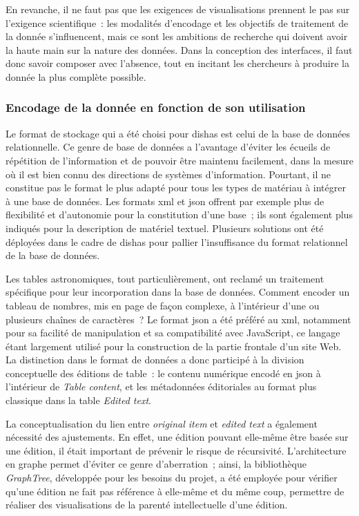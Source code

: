 \documentclass[a4paper,12pt,twoside]{book}
\newcommand{\eng}{\emph}
\newcommand{\oi}{\eng{original item}\xspace}
\newcommand{\bdd}{base de données\xspace}
\newcommand{\dishas}{\gls{dishas}\xspace}
\newcommand{\xml}{\gls{xml}\xspace}
\newcommand{\json}{\gls{json}\xspace}
\begin{document}
En revanche, il ne faut pas que les exigences de visualisations prennent le pas sur l'exigence scientifique~: les modalités d'encodage et les objectifs de traitement de la donnée s'influencent, mais ce sont les ambitions de recherche qui doivent avoir la haute main sur la nature des données. Dans la conception des interfaces, il faut donc savoir composer avec l'absence, tout en incitant les chercheurs à produire la donnée la plus complète possible.

			\subsubsection{Encodage de la donnée en fonction de son utilisation}
Le format de stockage qui a été choisi pour \dishas est celui de la \bdd relationnelle. Ce genre de \bdd a l'avantage d'éviter les écueils de répétition de l'information et de pouvoir être maintenu facilement, dans la mesure où il est bien connu des directions de systèmes d'information. Pourtant, il ne constitue pas le format le plus adapté pour tous les types de matériau à intégrer à une base de données. Les formats \xml et \json offrent par exemple plus de flexibilité et d'autonomie pour la constitution d'une base~; ils sont également plus indiqués pour la description de matériel textuel. Plusieurs solutions ont été déployées dans le cadre de \dishas pour pallier l'insuffisance du format relationnel de la base de données.

Les tables astronomiques, tout particulièrement, ont reclamé un traitement spécifique pour leur incorporation dans la \bdd. Comment encoder un tableau de nombres, mis en page de façon complexe, à l'intérieur d'une ou plusieurs chaînes de caractères~? Le format \json a été préféré au \xml, notamment pour sa facilité de manipulation et sa compatibilité avec JavaScript, ce langage étant largement utilisé pour la construction de la partie frontale d'un site Web. La distinction dans le format de données a donc participé à la division conceptuelle des éditions de table~: le contenu numérique encodé en \json à l'intérieur de \eng{Table content}, et les métadonnées éditoriales au format plus classique dans la table \eng{Edited text}.

La conceptualisation du lien entre \oi et \eng{edited text} a également nécessité des ajustements. En effet, une édition pouvant elle-même être basée sur une édition, il était important de prévenir le risque de récursivité. L'architecture en graphe permet d'éviter ce genre d'aberration~; ainsi, la bibliothèque \eng{GraphTree}, développée pour les besoins du projet, a été employée pour vérifier qu'une édition ne fait pas référence à elle-même et du même coup, permettre de réaliser des visualisations de la parenté intellectuelle d'une édition.
\end{document}
